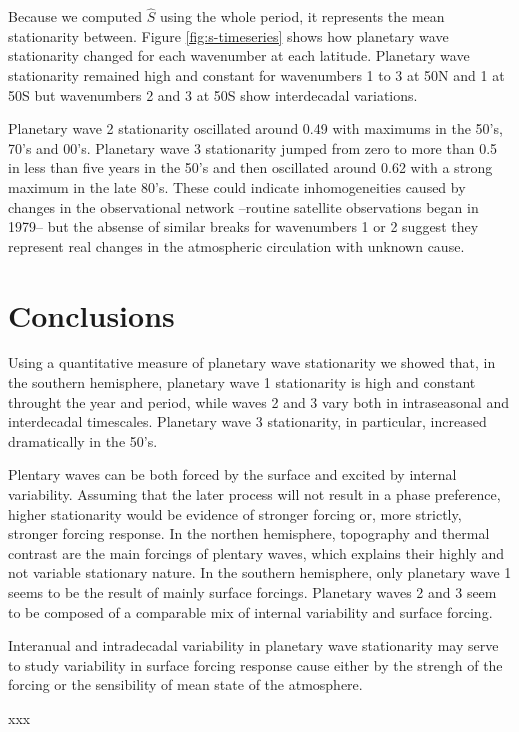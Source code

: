 \documentclass[draft,linenumbers]{agujournal2018}
\begin{document}
Because we computed \(\hat{S}\) using the whole period, it represents
the mean stationarity between. Figure \ref{fig:s-timeseries} shows how
planetary wave stationarity changed for each wavenumber at each
latitude. Planetary wave stationarity remained high and constant for
wavenumbers 1 to 3 at 50\degree N and 1 at 50\degree S but wavenumbers 2
and 3 at 50\degree S show interdecadal variations.

Planetary wave 2 stationarity oscillated around 0.49 with maximums in
the 50's, 70's and 00's. Planetary wave 3 stationarity jumped from zero
to more than 0.5 in less than five years in the 50's and then oscillated
around 0.62 with a strong maximum in the late 80's. These could indicate
inhomogeneities caused by changes in the observational network --routine
satellite observations began in 1979-- but the absense of similar breaks
for wavenumbers 1 or 2 suggest they represent real changes in the
atmospheric circulation with unknown cause.

\section{Conclusions}

Using a quantitative measure of planetary wave stationarity we showed
that, in the southern hemisphere, planetary wave 1 stationarity is high
and constant throught the year and period, while waves 2 and 3 vary both
in intraseasonal and interdecadal timescales. Planetary wave 3
stationarity, in particular, increased dramatically in the 50's.

Plentary waves can be both forced by the surface and excited by internal
variability. Assuming that the later process will not result in a phase
preference, higher stationarity would be evidence of stronger forcing
or, more strictly, stronger forcing response. In the northen hemisphere,
topography and thermal contrast are the main forcings of plentary waves,
which explains their highly and not variable stationary nature. In the
southern hemisphere, only planetary wave 1 seems to be the result of
mainly surface forcings. Planetary waves 2 and 3 seem to be composed of
a comparable mix of internal variability and surface forcing.

Interanual and intradecadal variability in planetary wave stationarity
may serve to study variability in surface forcing response cause either
by the strengh of the forcing or the sensibility of mean state of the
atmosphere.

xxx
\end{document}
